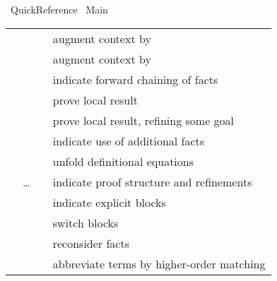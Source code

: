 %
\begin{isabellebody}%
\def\isabellecontext{Quick{\isacharunderscore}Reference}%
%
\isadelimtheory
\isanewline
\isanewline
%
\endisadelimtheory
%
\isatagtheory
{}\isamarkupfalse%
\ Quick{\isacharunderscore}Reference\isanewline
{}\ Main\isanewline
{}%
\endisatagtheory
{\isafoldtheory}%
%
\isadelimtheory
%
\endisadelimtheory
%
\isamarkuptrue%
%
\isamarkuptrue%
%
\isamarkuptrue%
%
\begin{isamarkuptext}%
\begin{tabular}{ll}
    \mbox{\isa{\isacommand{fix}}}~\isa{x} & augment context by \isa{{\isachardoublequote}{\isasymAnd}x{\isachardot}\ {\isasymbox}{\isachardoublequote}} \\
    \mbox{\isa{\isacommand{assume}}}~\isa{{\isachardoublequote}a{\isacharcolon}\ {\isasymphi}{\isachardoublequote}} & augment context by \isa{{\isachardoublequote}{\isasymphi}\ {\isasymLongrightarrow}\ {\isasymbox}{\isachardoublequote}} \\
    \mbox{\isa{\isacommand{then}}} & indicate forward chaining of facts \\
    \mbox{\isa{\isacommand{have}}}~\isa{{\isachardoublequote}a{\isacharcolon}\ {\isasymphi}{\isachardoublequote}} & prove local result \\
    \mbox{\isa{\isacommand{show}}}~\isa{{\isachardoublequote}a{\isacharcolon}\ {\isasymphi}{\isachardoublequote}} & prove local result, refining some goal \\
    \mbox{\isa{\isacommand{using}}}~\isa{a} & indicate use of additional facts \\
    \mbox{\isa{\isacommand{unfolding}}}~\isa{a} & unfold definitional equations \\
    \mbox{\isa{\isacommand{proof}}}~\isa{{\isachardoublequote}m\isactrlsub {\isadigit{1}}{\isachardoublequote}}~\dots~\mbox{\isa{\isacommand{qed}}}~\isa{{\isachardoublequote}m\isactrlsub {\isadigit{2}}{\isachardoublequote}} & indicate proof structure and refinements \\
    \mbox{\isa{\isacommand{{\isacharbraceleft}}}}~\isa{{\isachardoublequote}{\isasymdots}{\isachardoublequote}}~\mbox{\isa{\isacommand{{\isacharbraceright}}}} & indicate explicit blocks \\
    \mbox{\isa{\isacommand{next}}} & switch blocks \\
    \mbox{\isa{\isacommand{note}}}~\isa{{\isachardoublequote}a\ {\isacharequal}\ b{\isachardoublequote}} & reconsider facts \\
    \mbox{\isa{\isacommand{let}}}~\isa{{\isachardoublequote}p\ {\isacharequal}\ t{\isachardoublequote}} & abbreviate terms by higher-order matching \\
  \end{tabular}


\end{isamarkuptext}
\end{isabellebody}
